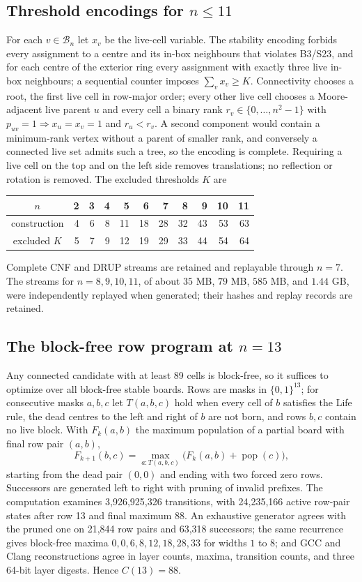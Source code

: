 \documentclass[10pt]{article}
\theoremstyle{remark}
\newcommand{\B}{\mathcal B}
\newcommand{\Pop}{\operatorname{pop}}
\newcommand{\bits}{\{0,1\}}
\begin{document}
\subsection[Threshold encodings for n <= 11]{Threshold encodings for $n\le11$}\label{app:sat}

For each $v\in\B_n$ let $x_v$ be the live-cell variable.  The stability encoding
forbids every assignment to a centre and its in-box neighbours that violates
B3/S23, and for each centre of the exterior ring every assignment with exactly
three live in-box neighbours; a sequential counter imposes $\sum_v x_v\ge K$.
Connectivity chooses a root, the first live cell in row-major order; every other
live cell chooses a Moore-adjacent live parent $u$ and every cell a binary rank
$r_v\in\{0,\ldots,n^2-1\}$ with $p_{uv}=1\Rightarrow x_u=x_v=1$ and $r_u<r_v$.  A
second component would contain a minimum-rank vertex without a parent of
smaller rank, and conversely a connected live set admits such a tree, so the
encoding is complete.  Requiring a live cell on the top and on the left side
removes translations; no reflection or rotation is removed.  The excluded
thresholds $K$ are
\begin{center}
\begin{tabular}{@{}c|rrrrrrrrrr@{}}
$n$ & 2&3&4&5&6&7&8&9&10&11\\
\midrule
construction &4&6&8&11&18&28&32&43&53&63\\
excluded $K$ &5&7&9&12&19&29&33&44&54&64
\end{tabular}
\end{center}
Complete CNF and DRUP streams are retained and replayable through $n=7$.  The
streams for $n=8,9,10,11$, of about $35$ MB, $79$ MB, $585$ MB, and $1.44$ GB,
were independently replayed when generated; their hashes and replay records are
retained.

\subsection[The block-free row program at n=13]{The block-free row program at $n=13$}\label{app:n13}

Any connected candidate with at least 89 cells is block-free, so it suffices to
optimize over all block-free stable boards.  Rows are masks in $\bits^{13}$; for
consecutive masks $a,b,c$ let $T(a,b,c)$ hold when every cell of $b$ satisfies the
Life rule, the dead centres to the left and right of $b$ are not born, and rows
$b,c$ contain no live block.  With $F_k(a,b)$ the maximum population of a partial
board with final row pair $(a,b)$,
\[
 F_{k+1}(b,c)=\max_{a:T(a,b,c)}\bigl(F_k(a,b)+\Pop(c)\bigr),
\]
starting from the dead pair $(0,0)$ and ending with two forced zero rows.
Successors are generated left to right with pruning of invalid prefixes.  The
computation examines 3,926,925,326 transitions, with 24,235,166 active row-pair
states after row 13 and final maximum 88.  An exhaustive generator agrees with
the pruned one on 21,844 row pairs and 63,318 successors; the same recurrence
gives block-free maxima $0,0,6,8,12,18,28,33$ for widths $1$ to $8$; and GCC and
Clang reconstructions agree in layer counts, maxima, transition counts, and three
64-bit layer digests.  Hence $C(13)=88$.
\end{document}

